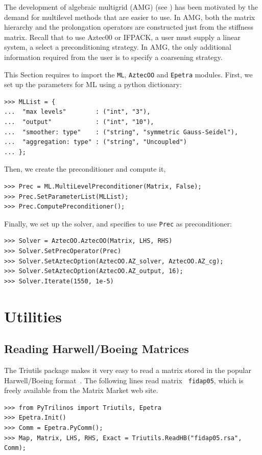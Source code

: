 \documentclass[10pt,relax]{SANDreport}
\begin{document}
The development of algebraic multigrid (AMG)  (see \cite[Section 8]{Briggs}) 
has been motivated by the demand for multilevel methods that are
easier to use.  In AMG, both the matrix hierarchy and the prolongation
operators are constructed just from the stiffness matrix.  Recall that to use
Aztec00 or IFPACK,  a user must supply a linear system, a select a
preconditioning strategy.  In AMG, the only additional information required
from the user is to specify a coarsening strategy.

This Section requires to import the {\tt ML}, {\tt AztecOO} and {\tt Epetra}
modules. First, we set up the parameters for ML using a python dictionary:
\begin{verbatim}
>>> MLList = {
...  "max levels"        : ("int", "3"),
...  "output"            : ("int", "10"),
...  "smoother: type"    : ("string", "symmetric Gauss-Seidel"),
...  "aggregation: type" : ("string", "Uncoupled")
... };
\end{verbatim}
Then, we create the preconditioner and compute it,
\begin{verbatim}
>>> Prec = ML.MultiLevelPreconditioner(Matrix, False);
>>> Prec.SetParameterList(MLList);
>>> Prec.ComputePreconditioner();
\end{verbatim}
Finally, we set up the solver, and specifies to use \verb!Prec! as
preconditioner:
\begin{verbatim}
>>> Solver = AztecOO.AztecOO(Matrix, LHS, RHS)
>>> Solver.SetPrecOperator(Prec)
>>> Solver.SetAztecOption(AztecOO.AZ_solver, AztecOO.AZ_cg);
>>> Solver.SetAztecOption(AztecOO.AZ_output, 16);
>>> Solver.Iterate(1550, 1e-5)
\end{verbatim}

\section{Utilities}
\label{sec:utilities}

\subsection{Reading Harwell/Boeing Matrices}
\label{sec:hb}

The Triutils package makes it very easy to read a matrix stored in the popular
Harwell/Boeing format~\cite{hb}. The following lines read matrix {\tt
  fidap05}, which is freely available from the Matrix Market web site.
\begin{verbatim}
>>> from PyTrilinos import Triutils, Epetra
>>> Epetra.Init()
>>> Comm = Epetra.PyComm();
>>> Map, Matrix, LHS, RHS, Exact = Triutils.ReadHB("fidap05.rsa", Comm);
\end{verbatim}
\end{document}
